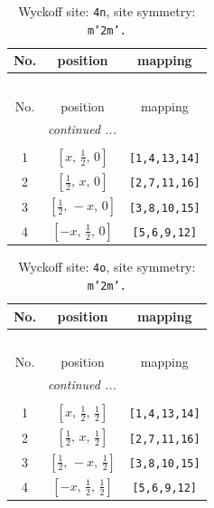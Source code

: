 \documentclass[fleqn,8pt]{jsarticle}
\begin{document}
\renewcommand{\arraystretch}{1.2}
\begin{longtable}{ccc}
\caption{Wyckoff site: {\tt 4n}, site symmetry: {\tt m'2m'.}}
 \\
 \hline \hline
No. & position & mapping \\ \hline \endfirsthead

\multicolumn{2}{l}{\tablename\ \thetable{}} \\
 \hline \hline
No. & position & mapping \\ \hline \endhead

 \hline \hline
\multicolumn{2}{r}{\footnotesize\it continued ...} \\ \endfoot

 \hline \hline
\multicolumn{2}{r}{} \\ \endlastfoot

1 & $\left[ x,\, \frac{1}{2},\, 0 \right]$ & {\tt [1,4,13,14]} \\ \hline
2 & $\left[ \frac{1}{2},\, x,\, 0 \right]$ & {\tt [2,7,11,16]} \\ \hline
3 & $\left[ \frac{1}{2},\, - x,\, 0 \right]$ & {\tt [3,8,10,15]} \\ \hline
4 & $\left[ - x,\, \frac{1}{2},\, 0 \right]$ & {\tt [5,6,9,12]} \\
\end{longtable}
\renewcommand{\arraystretch}{1.2}
\begin{longtable}{ccc}
\caption{Wyckoff site: {\tt 4o}, site symmetry: {\tt m'2m'.}}
 \\
 \hline \hline
No. & position & mapping \\ \hline \endfirsthead

\multicolumn{2}{l}{\tablename\ \thetable{}} \\
 \hline \hline
No. & position & mapping \\ \hline \endhead

 \hline \hline
\multicolumn{2}{r}{\footnotesize\it continued ...} \\ \endfoot

 \hline \hline
\multicolumn{2}{r}{} \\ \endlastfoot

1 & $\left[ x,\, \frac{1}{2},\, \frac{1}{2} \right]$ & {\tt [1,4,13,14]} \\ \hline
2 & $\left[ \frac{1}{2},\, x,\, \frac{1}{2} \right]$ & {\tt [2,7,11,16]} \\ \hline
3 & $\left[ \frac{1}{2},\, - x,\, \frac{1}{2} \right]$ & {\tt [3,8,10,15]} \\ \hline
4 & $\left[ - x,\, \frac{1}{2},\, \frac{1}{2} \right]$ & {\tt [5,6,9,12]} \\
\end{longtable}
\end{document}

